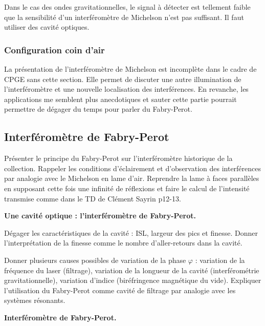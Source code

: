 \begin{transition}
Dans le cas des ondes gravitationnelles, le signal à détecter est tellement faible que la sensibilité d'un interféromètre de Michelson n'est pas suffisant.
Il faut utiliser des cavité optiques.
\end{transition}

\subsubsection{Configuration coin d'air}

\begin{remarque}
La présentation de l'interféromètre de Michelson est incomplète dans le cadre de CPGE sans cette section.
Elle permet de discuter une autre illumination de l'interféromètre et une nouvelle localisation des interférences.
En revanche, les applications me semblent plus anecdotiques et sauter cette partie pourrait permettre de dégager du temps pour parler du Fabry-Perot.
\end{remarque}

\subsection{Interféromètre de Fabry-Perot}

Présenter le principe du Fabry-Perot sur l'interféromètre historique de la collection.
Rappeler les conditions d'éclairement et d'observation des interférences par analogie avec le Michelson en lame d'air.
Reprendre la lame à faces parallèles en supposant cette fois une infinité de réflexions et faire le calcul de l'intensité transmise comme dans le TD de Clément Sayrin p12-13.

\begin{slide}
\textbf{Une cavité optique : l'interféromètre de Fabry-Perot.}
\end{slide}
Dégager les caractéristiques de la cavité : ISL, largeur des pics et finesse.
Donner l'interprétation de la finesse comme le nombre d'aller-retours dans la cavité.

Donner plusieurs causes possibles de variation de la phase $\varphi$ : variation de la fréquence du laser (filtrage), variation de la longueur de la cavité (interférométrie gravitationnelle), variation d'indice (biréfringence magnétique du vide).
Expliquer l'utilisation du Fabry-Perot comme cavité de filtrage par analogie avec les systèmes résonants.

\begin{experience}
\textbf{Interféromètre de Fabry-Perot.}
\end{experience}

